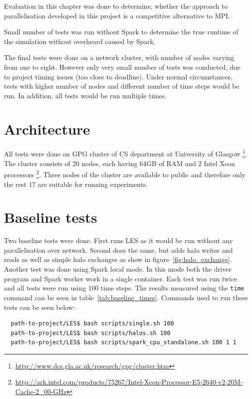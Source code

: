 \documentclass{l4proj}
\begin{document}
Evaluation in this chapter was done to determine, whether the approach to parallelisation
developed in this project is a competitive alternative to MPI.

Small number of tests was run without Spark to determine the true runtime of
the simulation without overheard caused by Spark.

The final tests were done on a network cluster, with number of nodes varying from one
to eight. However only very small number of tests was conducted, due to 
project timing issues (too close to deadline). Under normal circumstances,
tests with higher number of nodes and different number of time steps would be run.
In addition, all tests would be run multiple times.

\section{Architecture}

All tests were done on GPG cluster of CS department at University of Glasgow
\footnote{\url{http://www.dcs.gla.ac.uk/research/gpg/cluster.htm}}.
The cluster consists of 20 nodes, each having 64GB of RAM and 2 Intel Xeon processors
\footnote{\url{http://ark.intel.com/products/75267/Intel-Xeon-Processor-E5-2640-v2-20M-Cache-2_00-GHz}}.
Three nodes of the cluster are available to public and therefore only the rest 17 are
suitable for running experiments.

\section{Baseline tests}

Two baseline tests were done. First runs LES as it would be run without any
parallelisation over network. Second does the same, but adds halo writes and reads
as well as simple halo exchanges as show in figure~\ref{fig:halo_exchange}.
Another test was done using Spark local mode. In this mode both the driver 
program and Spark worker work in a single container. Each test was run twice and 
all tests were run using 100 time steps. The results measured using the \texttt{time} command
can be seen in table~\ref{tab:baseline_times}. Commands used to run these tests can be seen below:
\begin{verbatim}
  path-to-project/LES$ bash scripts/single.sh 100
  path-to-project/LES$ bash scripts/halos.sh 100
  path-to-project/LES$ bash scripts/spark_cpu_standalone.sh 100 1 1
\end{verbatim}
\end{document}
